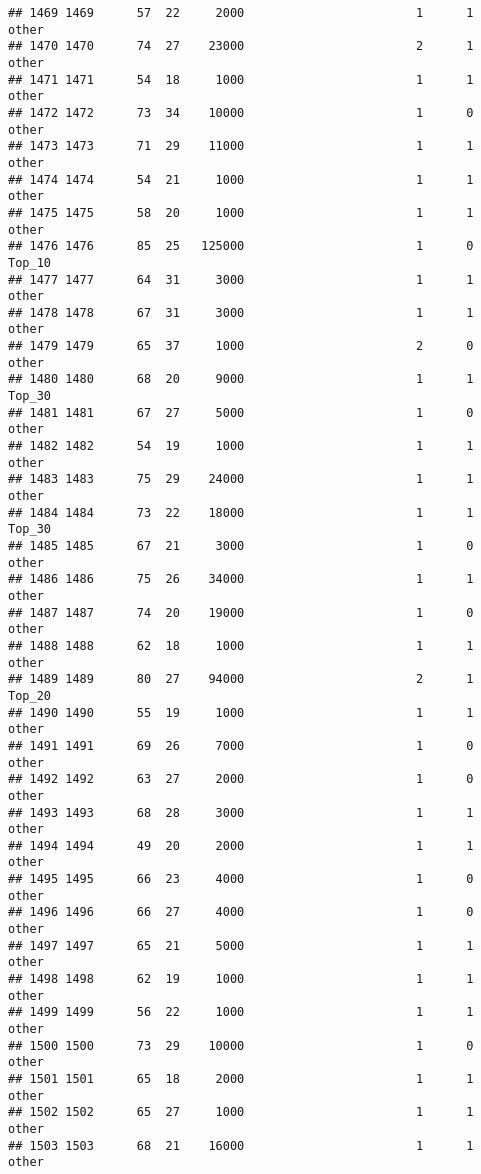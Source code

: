 \documentclass[
]{article}
\begin{document}
\begin{verbatim}
## 1469 1469      57  22     2000                        1      1    other
## 1470 1470      74  27    23000                        2      1    other
## 1471 1471      54  18     1000                        1      1    other
## 1472 1472      73  34    10000                        1      0    other
## 1473 1473      71  29    11000                        1      1    other
## 1474 1474      54  21     1000                        1      1    other
## 1475 1475      58  20     1000                        1      1    other
## 1476 1476      85  25   125000                        1      0   Top_10
## 1477 1477      64  31     3000                        1      1    other
## 1478 1478      67  31     3000                        1      1    other
## 1479 1479      65  37     1000                        2      0    other
## 1480 1480      68  20     9000                        1      1   Top_30
## 1481 1481      67  27     5000                        1      0    other
## 1482 1482      54  19     1000                        1      1    other
## 1483 1483      75  29    24000                        1      1    other
## 1484 1484      73  22    18000                        1      1   Top_30
## 1485 1485      67  21     3000                        1      0    other
## 1486 1486      75  26    34000                        1      1    other
## 1487 1487      74  20    19000                        1      0    other
## 1488 1488      62  18     1000                        1      1    other
## 1489 1489      80  27    94000                        2      1   Top_20
## 1490 1490      55  19     1000                        1      1    other
## 1491 1491      69  26     7000                        1      0    other
## 1492 1492      63  27     2000                        1      0    other
## 1493 1493      68  28     3000                        1      1    other
## 1494 1494      49  20     2000                        1      1    other
## 1495 1495      66  23     4000                        1      0    other
## 1496 1496      66  27     4000                        1      0    other
## 1497 1497      65  21     5000                        1      1    other
## 1498 1498      62  19     1000                        1      1    other
## 1499 1499      56  22     1000                        1      1    other
## 1500 1500      73  29    10000                        1      0    other
## 1501 1501      65  18     2000                        1      1    other
## 1502 1502      65  27     1000                        1      1    other
## 1503 1503      68  21    16000                        1      1    other

\end{verbatim}
\end{document}
